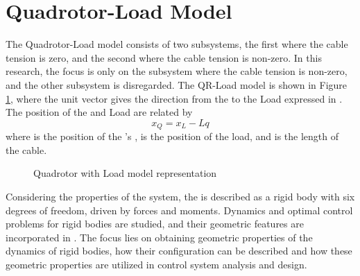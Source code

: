 \section{Quadrotor-Load Model}	\label{sec:mod.QRLmod}
The Quadrotor-Load model consists of two subsystems, the first where the cable tension is zero, and the second where the cable tension is non-zero.
In this research, the focus is only on the subsystem where the cable tension is non-zero, and the other subsystem is disregarded.
The QR-Load model is shown in Figure \ref{fig:mod.modelQRL}, where the unit vector  gives the direction from the  to the Load expressed in \BF. The position of the  and Load are related by
\begin{equation}\label{eq:mod.xQ2xL}
x_Q=x_L-Lq
\end{equation}
where  is the position of the 's ,  is the position of the load, and  is the length of the cable.
\begin{figure}[h!]
	\centering
	\caption{Quadrotor with Load model representation\label{fig:mod.modelQRL}}
\end{figure}	

Considering the properties of the system, the  is described as a rigid body with six degrees of freedom, driven by forces and moments. 
Dynamics and optimal control problems for rigid bodies are studied, and their geometric features are incorporated in \cite{Lee2008}. The focus lies on obtaining geometric properties of the dynamics of rigid bodies, how their configuration can be described and how these geometric properties are utilized in control system analysis and design. 

